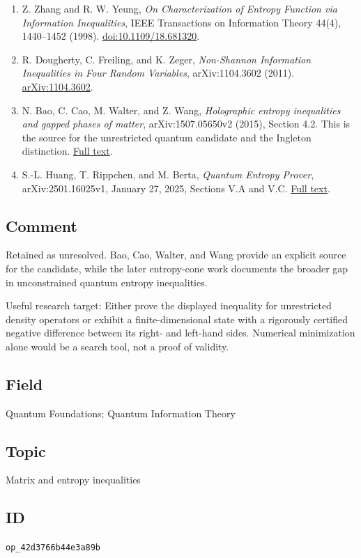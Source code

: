 \begin{enumerate}[label={},leftmargin=4.8em,labelsep=0.5em]
  \footnotesize
  \item[\textup{[Zhang98]}]\label{ref:42d3-zhang98}
  Z. Zhang and R. W. Yeung, \emph{On Characterization of Entropy Function via Information Inequalities}, IEEE Transactions on Information Theory 44(4), 1440--1452 (1998). \href{https://doi.org/10.1109/18.681320}{doi:10.1109/18.681320}.

  \item[\textup{[DFZ11]}]\label{ref:42d3-dfz11}
  R. Dougherty, C. Freiling, and K. Zeger, \emph{Non-Shannon Information Inequalities in Four Random Variables}, arXiv:1104.3602 (2011). \href{https://arxiv.org/abs/1104.3602}{arXiv:1104.3602}.

  \item[\textup{[Bao15]}]\label{ref:42d3-bao15}
  N. Bao, C. Cao, M. Walter, and Z. Wang, \emph{Holographic entropy inequalities and gapped phases of matter}, arXiv:1507.05650v2 (2015), Section 4.2. This is the source for the unrestricted quantum candidate and the Ingleton distinction. \href{https://arxiv.org/html/1507.05650v2}{Full text}.

  \item[\textup{[Huang25]}]\label{ref:42d3-huang25}
  S.-L. Huang, T. Rippchen, and M. Berta, \emph{Quantum Entropy Prover}, arXiv:2501.16025v1, January 27, 2025, Sections V.A and V.C. \href{https://arxiv.org/html/2501.16025v1}{Full text}.
\end{enumerate}

\subsection*{Comment}

Retained as unresolved. Bao, Cao, Walter, and Wang provide an explicit source for the candidate, while the later entropy-cone work documents the broader gap in unconstrained quantum entropy inequalities.

Useful research target: Either prove the displayed inequality for unrestricted density operators or exhibit a finite-dimensional state with a rigorously certified negative difference between its right- and left-hand sides. Numerical minimization alone would be a search tool, not a proof of validity.

\subsection*{Field}

Quantum Foundations; Quantum Information Theory

\subsection*{Topic}

Matrix and entropy inequalities

\subsection*{ID}

\texttt{op\_42d3766b44e3a89b}
